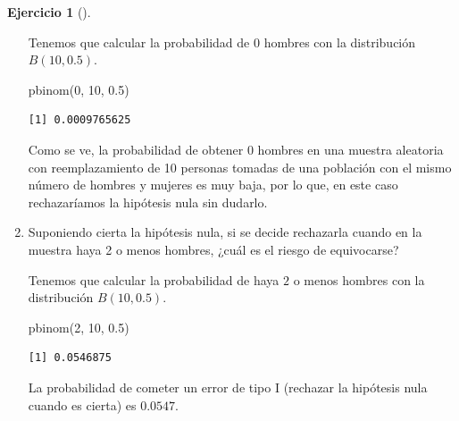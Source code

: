 \documentclass[
  a4paper,
]{scrreport}
\newenvironment{Shaded}{\begin{snugshade}}{\end{snugshade}}
\newcommand{\DecValTok}[1]{\textcolor[rgb]{0.68,0.00,0.00}{#1}}
\newcommand{\FloatTok}[1]{\textcolor[rgb]{0.68,0.00,0.00}{#1}}
\newcommand{\FunctionTok}[1]{\textcolor[rgb]{0.28,0.35,0.67}{#1}}
\newcommand{\NormalTok}[1]{\textcolor[rgb]{0.00,0.23,0.31}{#1}}
\theoremstyle{definition}
\newtheorem{exercise}{Ejercicio}[chapter]
\theoremstyle{remark}
\begin{document}
\begin{exercise}[]
\begin{enumerate}
\begin{tcolorbox}
  Tenemos que calcular la probabilidad de \(0\) hombres con la
  distribución \(B(10, 0.5)\).

\begin{Shaded}
\begin{Highlighting}[]
\FunctionTok{pbinom}\NormalTok{(}\DecValTok{0}\NormalTok{, }\DecValTok{10}\NormalTok{, }\FloatTok{0.5}\NormalTok{)}
\end{Highlighting}
\end{Shaded}

\begin{verbatim}
[1] 0.0009765625
\end{verbatim}

  Como se ve, la probabilidad de obtener 0 hombres en una muestra
  aleatoria con reemplazamiento de 10 personas tomadas de una población
  con el mismo número de hombres y mujeres es muy baja, por lo que, en
  este caso rechazaríamos la hipótesis nula sin dudarlo.

  \end{tcolorbox}
\item
  Suponiendo cierta la hipótesis nula, si se decide rechazarla cuando en
  la muestra haya 2 o menos hombres, ¿cuál es el riesgo de equivocarse?

  \begin{tcolorbox}[enhanced jigsaw, breakable, toptitle=1mm, colbacktitle=quarto-callout-tip-color!10!white, rightrule=.15mm, opacityback=0, opacitybacktitle=0.6, titlerule=0mm, coltitle=black, colframe=quarto-callout-tip-color-frame, colback=white, bottomtitle=1mm, leftrule=.75mm, toprule=.15mm, title=\textcolor{quarto-callout-tip-color}{\faLightbulb}\hspace{0.5em}{Solución}, arc=.35mm, bottomrule=.15mm, left=2mm]

  Tenemos que calcular la probabilidad de haya \(2\) o menos hombres con
  la distribución \(B(10, 0.5)\).

\begin{Shaded}
\begin{Highlighting}[]
\FunctionTok{pbinom}\NormalTok{(}\DecValTok{2}\NormalTok{, }\DecValTok{10}\NormalTok{, }\FloatTok{0.5}\NormalTok{)}
\end{Highlighting}
\end{Shaded}

\begin{verbatim}
[1] 0.0546875
\end{verbatim}

  La probabilidad de cometer un error de tipo I (rechazar la hipótesis
  nula cuando es cierta) es \(0.0547\).


\end{tcolorbox}
\end{enumerate}
\end{exercise}
\end{document}
